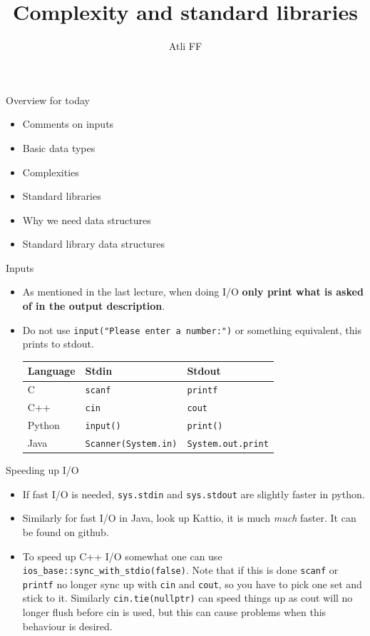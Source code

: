 \documentclass{beamer}
\title{Complexity and standard libraries}
\author{Atli FF}
\institute{\href{http://ru.is/td}{School of Computer Science} \\[2pt] \href{http://ru.is}{Reykjavík University}}
\begin{document}
\maketitle


\begin{frame}[plain]{Overview for today}
    \vspace{20pt}
    \begin{itemize}
        \item Comments on inputs
        \item Basic data types
        \item Complexities
        \item Standard libraries
        \item Why we need data structures
        \item Standard library data structures
    \end{itemize}
\end{frame}

\begin{frame}[plain]{Inputs}
    \begin{itemize}
        \item As mentioned in the last lecture, when doing I/O \textbf{only print what is asked of in the output description}.
        \item Do not use \texttt{input("Please enter a number:")} or something equivalent, this prints to stdout.
        \vspace{15pt}
        \begin{tabular}{l|l|l}
            Language & Stdin & Stdout \\ \hline
            C & \texttt{scanf} & \texttt{printf} \\
            C++ & \texttt{cin} & \texttt{cout} \\
            Python & \texttt{input()} & \texttt{print()} \\
            Java & \texttt{Scanner(System.in)} & \texttt{System.out.print} \\
        \end{tabular}
    \end{itemize}
\end{frame}

\begin{frame}[plain]{Speeding up I/O}
    \begin{itemize}
        \item If fast I/O is needed, \texttt{sys.stdin} and \texttt{sys.stdout} are slightly faster in python.
        \item Similarly for fast I/O in Java, look up Kattio, it is much \textit{much} faster. It can be found on github.
        \item To speed up C++ I/O somewhat one can use \texttt{ios\_{}base::sync\_{}with\_{}stdio(false)}. Note that if this is done \texttt{scanf} or \texttt{printf} no longer sync up with \texttt{cin} and \texttt{cout}, so you have to pick one set and stick to it. Similarly \texttt{cin.tie(nullptr)} can speed things up as cout will no longer flush before cin is used, but this can cause problems when this behaviour is desired.
    \end{itemize}
\end{frame}
\end{document}
